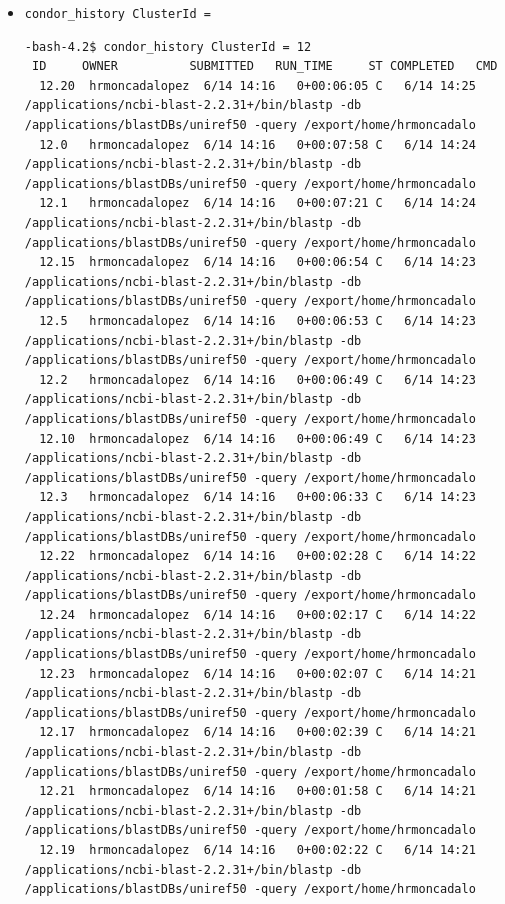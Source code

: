 \documentclass{article}
\begin{document}
\begin{itemize}
\item \verb+condor_history ClusterId = +
\tiny
\begin{verbatim}
-bash-4.2$ condor_history ClusterId = 12
 ID     OWNER          SUBMITTED   RUN_TIME     ST COMPLETED   CMD            
  12.20  hrmoncadalopez  6/14 14:16   0+00:06:05 C   6/14 14:25 /applications/ncbi-blast-2.2.31+/bin/blastp -db /applications/blastDBs/uniref50 -query /export/home/hrmoncadalo
  12.0   hrmoncadalopez  6/14 14:16   0+00:07:58 C   6/14 14:24 /applications/ncbi-blast-2.2.31+/bin/blastp -db /applications/blastDBs/uniref50 -query /export/home/hrmoncadalo
  12.1   hrmoncadalopez  6/14 14:16   0+00:07:21 C   6/14 14:24 /applications/ncbi-blast-2.2.31+/bin/blastp -db /applications/blastDBs/uniref50 -query /export/home/hrmoncadalo
  12.15  hrmoncadalopez  6/14 14:16   0+00:06:54 C   6/14 14:23 /applications/ncbi-blast-2.2.31+/bin/blastp -db /applications/blastDBs/uniref50 -query /export/home/hrmoncadalo
  12.5   hrmoncadalopez  6/14 14:16   0+00:06:53 C   6/14 14:23 /applications/ncbi-blast-2.2.31+/bin/blastp -db /applications/blastDBs/uniref50 -query /export/home/hrmoncadalo
  12.2   hrmoncadalopez  6/14 14:16   0+00:06:49 C   6/14 14:23 /applications/ncbi-blast-2.2.31+/bin/blastp -db /applications/blastDBs/uniref50 -query /export/home/hrmoncadalo
  12.10  hrmoncadalopez  6/14 14:16   0+00:06:49 C   6/14 14:23 /applications/ncbi-blast-2.2.31+/bin/blastp -db /applications/blastDBs/uniref50 -query /export/home/hrmoncadalo
  12.3   hrmoncadalopez  6/14 14:16   0+00:06:33 C   6/14 14:23 /applications/ncbi-blast-2.2.31+/bin/blastp -db /applications/blastDBs/uniref50 -query /export/home/hrmoncadalo
  12.22  hrmoncadalopez  6/14 14:16   0+00:02:28 C   6/14 14:22 /applications/ncbi-blast-2.2.31+/bin/blastp -db /applications/blastDBs/uniref50 -query /export/home/hrmoncadalo
  12.24  hrmoncadalopez  6/14 14:16   0+00:02:17 C   6/14 14:22 /applications/ncbi-blast-2.2.31+/bin/blastp -db /applications/blastDBs/uniref50 -query /export/home/hrmoncadalo
  12.23  hrmoncadalopez  6/14 14:16   0+00:02:07 C   6/14 14:21 /applications/ncbi-blast-2.2.31+/bin/blastp -db /applications/blastDBs/uniref50 -query /export/home/hrmoncadalo
  12.17  hrmoncadalopez  6/14 14:16   0+00:02:39 C   6/14 14:21 /applications/ncbi-blast-2.2.31+/bin/blastp -db /applications/blastDBs/uniref50 -query /export/home/hrmoncadalo
  12.21  hrmoncadalopez  6/14 14:16   0+00:01:58 C   6/14 14:21 /applications/ncbi-blast-2.2.31+/bin/blastp -db /applications/blastDBs/uniref50 -query /export/home/hrmoncadalo
  12.19  hrmoncadalopez  6/14 14:16   0+00:02:22 C   6/14 14:21 /applications/ncbi-blast-2.2.31+/bin/blastp -db /applications/blastDBs/uniref50 -query /export/home/hrmoncadalo

\end{verbatim}
\end{itemize}
\end{document}

